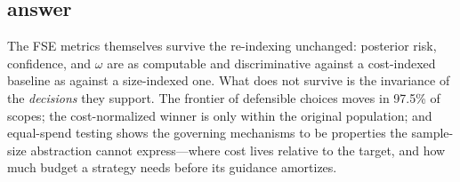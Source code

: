 \subsection{\rqtwo{} answer}

The FSE metrics themselves survive the re-indexing unchanged: posterior
risk, confidence, and $\omega$ are as computable and discriminative
against a cost-indexed baseline as against a size-indexed one. What does
not survive is the invariance of the \emph{decisions} they support. The
frontier of defensible choices moves in 97.5\% of scopes; the
cost-normalized winner is \srs{} only within the original population; and
equal-spend testing shows the governing mechanisms to be properties the
sample-size abstraction cannot express---where cost lives relative to the
target, and how much budget a strategy needs before its guidance
amortizes.
